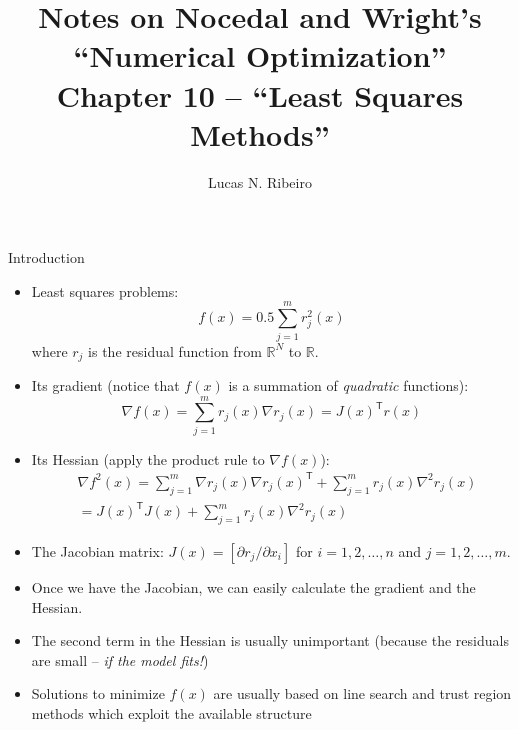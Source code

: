 \documentclass{beamer}
\title{Notes on Nocedal and Wright's ``Numerical Optimization''\\Chapter 10 --  ``Least Squares Methods''}
\author{Lucas N. Ribeiro}
\date{}
\newcommand{\tran}{\mathsf{T}}
\newcommand{\mbb}[1]{\ensuremath{\mathbb{#1}}}
\begin{document}
 
\frame{\titlepage}
 
\begin{frame}[allowframebreaks]{Introduction}
	\begin{itemize}
		\item Least squares problems:
		\[
			f(x) = 0.5 \sum_{j=1}^m r_j^2(x)
		\]
		where $r_j$ is the residual function from $\mbb{R}^N$ to $\mbb{R}$.
		\item Its gradient (notice that $f(x)$ is a summation of \emph{quadratic} functions):
		\[
			\nabla f(x) = \sum_{j=1}^m r_j(x) \nabla r_j(x) = J(x)^\tran r(x)
		\]
		\item Its Hessian (apply the product rule to $\nabla f(x)$):
		\begin{align}
			&\nabla f^2(x) = \sum_{j=1}^m \nabla r_j(x) \nabla r_j(x)^\tran + \sum_{j=1}^m r_j(x) \nabla^2 r_j(x) \\
			&=J(x)^\tran J(x) + \sum_{j=1}^m r_j(x) \nabla^2 r_j(x) 
		\end{align}
		\item The Jacobian matrix: $J(x) = [\partial r_j / \partial x_i]$ for $i=1,2,\ldots,n$ and $j=1,2,\ldots,m$.
		\item Once we have the Jacobian, we can easily calculate the gradient and the Hessian.
		\item The second term in the Hessian is usually unimportant (because the residuals are small -- \emph{if the model fits!})
		\item Solutions to minimize $f(x)$ are usually based on line search and trust region methods which exploit the available structure
	\end{itemize}
\end{frame}
\end{document}
